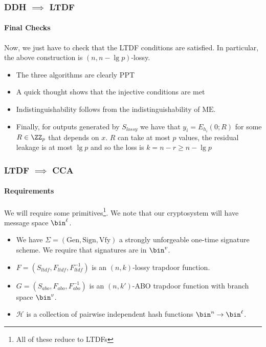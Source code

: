\documentclass{beamer}
\begin{document}
\begin{frame}
    \frametitle{DDH $\implies$ LTDF}
    \framesubtitle{Final Checks}
    Now, we just have to check that the LTDF conditions are satisfied.
    In particular, the above construction is $(n, n - \lg p)$-lossy.
    \begin{itemize}
        \item The three algorithms are clearly PPT
        \item A quick thought shows that the injective conditions are met
        \item Indistinguishability follows from the indistinguishability of $\mathrm{ME}$.
        \item Finally, for outputs generated by $S_{lossy}$ we have that
              $y_i = E_{h_i}(0; R)$ for some $R \in \ZZ_p$ that depends on $x$. $R$ can take
              at most $p$ values, the residual leakage is at most $\lg p$ and so the loss is
              $k = n - r \geq n - \lg p$
    \end{itemize}
\end{frame}




\begin{frame}
    \frametitle{LTDF $\implies$ CCA}
    \framesubtitle{Requirements}
    We will require some primitives\footnote{All of these reduce to LTDFs}.
    We note that our cryptosystem will have message space $\bin^\ell$.
    \begin{itemize}
        \item We have $\Sigma = (\mathrm{Gen}, \mathrm{Sign}, \mathrm{Vfy})$ a strongly unforgeable one-time signature scheme. We require that signatures are in $\bin^v$.
        \item $F = (S_{ltdf}, F_{ltdf}, F^{-1}_{ltdf})$ is an $(n, k)$-lossy trapdoor function.
        \item $G = (S_{abo}, F_{abo}, F^{-1}_{abo})$ is an $(n, k')$-ABO trapdoor function with branch space $\bin^v$.
        \item $\mathcal{H}$ is a collection of pairwise independent hash functions $\bin^n \to \bin^\ell$.
    \end{itemize}
\end{frame}
\end{document}
